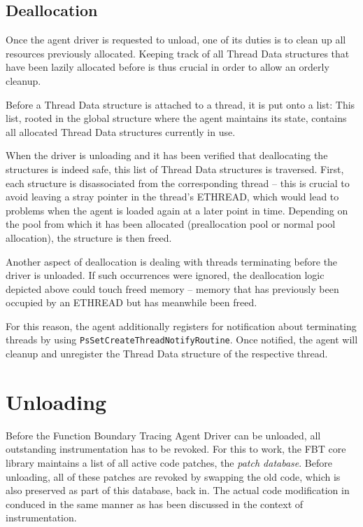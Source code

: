 \subsection{Deallocation}
Once the agent driver is requested to unload, one of its duties is to
clean up all resources previously allocated. Keeping track of all
Thread Data structures that have been lazily allocated before is thus
crucial in order to allow an orderly cleanup.

Before a Thread Data structure is attached to a thread, it is put 
onto a list: This list, rooted in the global structure where the agent 
maintains its state, contains all allocated Thread Data structures 
currently in use.

When the driver is unloading and it has been verified that deallocating
the structures is indeed safe, this list of Thread Data structures is
traversed. First, each structure is disassociated from the corresponding 
thread -- this is crucial to avoid leaving a stray pointer in the thread's
ETHREAD, which would lead to problems when the agent is loaded again at a later point in time. 
Depending on the pool from which it has been allocated (preallocation pool or
normal pool allocation), the structure is then freed.

Another aspect of deallocation is dealing with threads terminating before
the driver is unloaded. If such occurrences were ignored, the deallocation
logic depicted above could touch freed memory -- memory that has previously 
been occupied by an ETHREAD but has meanwhile been freed.

For this reason, the agent additionally registers for notification about
terminating threads by using \verb|PsSetCreateThreadNotifyRoutine|. Once
notified, the agent will cleanup and unregister the Thread Data structure
of the respective thread.

\section{Unloading}
\label{sec:Unloading}
Before the Function Boundary Tracing Agent Driver can be unloaded, all
outstanding instrumentation has to be revoked. For this to work, the
FBT core library maintains a list of all active code patches, the 
\emph{patch database}. Before unloading, all of these patches are revoked 
by swapping the old code, which is also preserved as part of this database, back in.
The actual code modification in conduced in the same manner as has been discussed
in the context of instrumentation.

